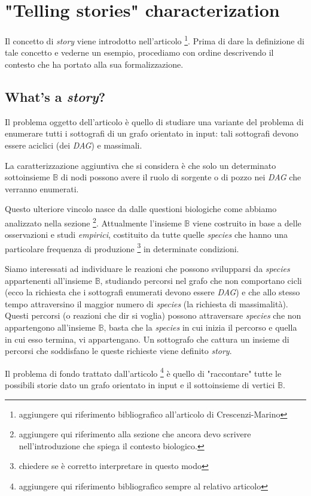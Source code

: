 \section{"Telling stories" characterization}
Il concetto di \emph{story} viene introdotto nell'articolo
\footnote{aggiungere qui riferimento bibliografico all'articolo di
  Crescenzi-Marino}. Prima di dare la definizione di tale concetto e
vederne un esempio, procediamo con ordine descrivendo il contesto che
ha portato alla sua formalizzazione.

\subsection{What's a \emph{story}?}
Il problema oggetto dell'articolo \`e quello di studiare una variante
del problema di enumerare tutti i sottografi di un grafo orientato in
input: tali sottografi devono essere aciclici (dei \emph{DAG}) e
massimali.

La caratterizzazione aggiuntiva che si considera \`e che solo un
determinato sottoinsieme $\mathbb{B}$ di nodi possono avere il ruolo
di sorgente o di pozzo nei \emph{DAG} che verranno enumerati. 

Questo ulteriore vincolo nasce da dalle questioni biologiche come
abbiamo analizzato nella sezione \footnote{aggiungere qui riferimento
  alla sezione che ancora devo scrivere nell'introduzione che spiega
  il contesto biologico.}. Attualmente l'insieme $\mathbb{B}$ viene
costruito in base a delle osservazioni e studi \emph{empirici},
costituito da tutte quelle \emph{species} che hanno una particolare
frequenza di produzione \footnote{chiedere se \`e corretto
  interpretare in questo modo} in determinate condizioni.

Siamo interessati ad individuare le reazioni che possono svilupparsi
da \emph{species} appartenenti all'insieme $\mathbb{B}$, studiando
percorsi nel grafo che non comportano cicli (ecco la richiesta che i
sottografi enumerati devono essere \emph{DAG}) e che allo stesso tempo
attraversino il maggior numero di \emph{species} (la richiesta di
massimalit\`a). Questi percorsi (o reazioni che dir si voglia) possono
attraversare \emph{species} che non appartengono all'insieme
$\mathbb{B}$, basta che la \emph{species} in cui inizia il percorso e
quella in cui esso termina, vi appartengano. Un sottografo che cattura
un insieme di percorsi che soddisfano le queste richieste viene
definito \emph{story}.

Il problema di fondo trattato dall'articolo \footnote{aggiungere qui
  riferimento bibliografico sempre al relativo articolo} \`e quello di
"raccontare" tutte le possibili storie dato un grafo orientato in
input e il sottoinsieme di vertici $\mathbb{B}$.

